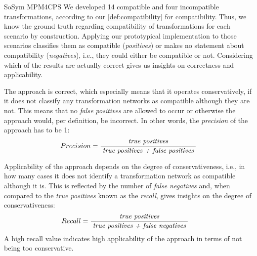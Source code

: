 \begin{copiedFrom}{SoSym MPM4CPS}
We developed 14 compatible and four incompatible transformations, according to our \autoref{def:compatibility} for compatibility.
Thus, we know the ground truth regarding compatibility of transformations for each scenario by construction.
Applying our prototypical implementation to those scenarios classifies them as compatible (\emph{positives}) or makes no statement about compatibility (\emph{negatives}), i.e., they could either be compatible or not.
Considering which of the results are actually correct gives us insights on correctness and applicability.

The approach is correct, which especially means that it operates conservatively, if it does not classify any transformation networks as compatible although they are not.
This means that no \emph{false positives} are allowed to occur or otherwise the approach would, per definition, be incorrect.
In other words, the \emph{precision} of the approach has to be 1:
\begin{align*}
    \hspace{1em} &
    Precision = \frac{\; \textit{true positives} \;}{\; \textit{true positives + false positives} \;}
\end{align*}

Applicability of the approach depends on the degree of conservativeness, i.e., in how many cases it does not identify a transformation network as compatible although it is.
This is reflected by the number of \emph{false negatives} and, when compared to the \emph{true positives} known as the \emph{recall}, gives insights on the degree of conservativeness:
\begin{align*}
    &
    Recall = \frac{\; \textit{true positives} \;}{\; \textit{true positives + false negatives} \;}
\end{align*}
A high recall value indicates high applicability of the approach in terms of not being too conservative.


\end{copiedFrom}
